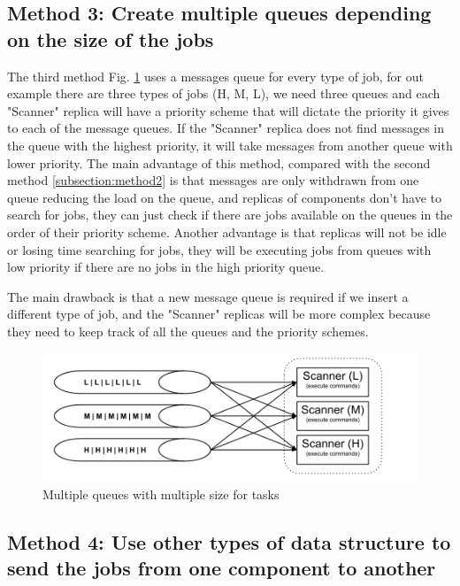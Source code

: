 \subsection{Method 3: Create multiple queues depending on the size of the jobs}

The third method Fig. \ref{fig:multipleQueueDistributionOfTasks} uses a messages queue for every type of job, for out example there are three types of jobs (H, M, L), we need three queues and each "Scanner" replica will have a priority scheme that will dictate the priority it gives to each of the message queues. If the "Scanner" replica does not find messages in the queue with the highest priority, it will take messages from another queue with lower priority. The main advantage of this method, compared with the second method \ref{subsection:method2} is that messages are only withdrawn from one queue reducing the load on the queue, and replicas of components don't have to search for jobs, they can just check if there are jobs available on the queues in the order of their priority scheme. Another advantage is that replicas will not be idle or losing time searching for jobs, they will be executing jobs from queues with low priority if there are no jobs in the high priority queue.

The main drawback is that a new message queue is required if we insert a different type of job, and the "Scanner" replicas will be more complex because they need to keep track of all the queues and the priority schemes.

\begin{figure}[ht]
\centering
\includegraphics[width=\linewidth]{./img/3_MultipleQueueLoadBalancing.png}
\caption{Multiple queues with multiple size for tasks}
\label{fig:multipleQueueDistributionOfTasks}
\end{figure}

\subsection{Method 4: Use other types of data structure to send the jobs from one component to another}

